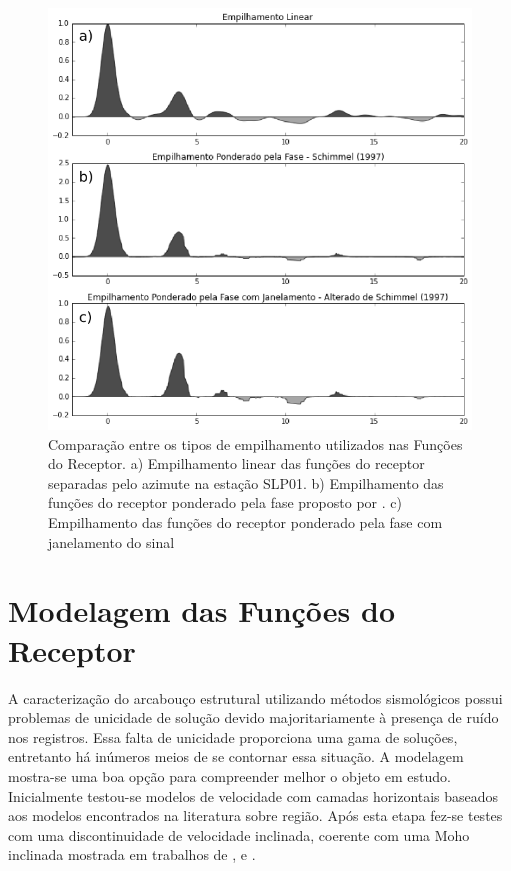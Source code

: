 \begin{figure}[!ht]
\centering
\includegraphics[scale=0.8]{Figs/empilhamento.png}
\caption[Comparação entre os tipos de empilhamento utilizados nas Funções do Receptor.]{Comparação entre os tipos de empilhamento utilizados nas Funções do Receptor. a) Empilhamento linear das funções do receptor separadas pelo azimute na estação SLP01. b)  Empilhamento das funções do receptor ponderado pela fase proposto por \cite{schimmel_noise_1997}. c) Empilhamento das funções do receptor ponderado pela fase com janelamento do sinal}
\label{empilhamento}
\end{figure}

\section{Modelagem das Funções do Receptor}

A caracterização do arcabouço estrutural utilizando métodos sismológicos possui problemas de unicidade de solução devido majoritariamente à presença de ruído nos registros. Essa falta de unicidade proporciona uma gama de soluções, entretanto há inúmeros meios de se contornar essa situação. A modelagem mostra-se uma boa opção para compreender melhor o objeto em estudo. Inicialmente testou-se modelos de velocidade com camadas horizontais baseados aos modelos encontrados na literatura sobre região. Após esta etapa fez-se testes com uma discontinuidade de velocidade inclinada, coerente com uma Moho inclinada mostrada em trabalhos de \cite{sand_franca_crustal_2004}, \cite{flora_solon_ancient_2013} e \cite{Silva_2014} . 

